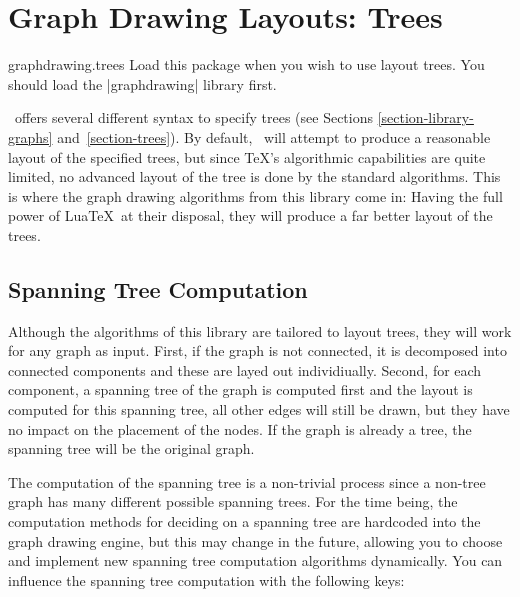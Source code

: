 %
%
%

\section{Graph Drawing Layouts: Trees}
\label{section-first-graphdrawing-library-in-manual}
\label{section-library-graphdrawing-trees}

{

\begin{tikzlibrary}{graphdrawing.trees}
  Load this package when you wish to use layout trees. You should load
  the |graphdrawing| library first. 
\end{tikzlibrary}


\tikzname\ offers several different syntax to specify trees (see
Sections \ref{section-library-graphs} and~\ref{section-trees}). By
default, \tikzname\ will attempt to produce a reasonable layout of the
specified trees, but since \TeX's algorithmic capabilities are quite
limited, no advanced layout of the tree is done by the standard
algorithms. This is where the graph drawing algorithms from this
library come in: Having the full power of Lua\TeX\ at their disposal,
they will produce a far better layout of the trees.



\subsection{Spanning Tree Computation}

Although the algorithms of this library are tailored to layout trees,
they will work for any graph as input. First, if the graph is not
connected, it is decomposed into connected components and these are
layed out individiually. Second, for each component, a spanning tree of
the graph is computed first and the layout is computed for this
spanning tree, all other edges will still be drawn, but they have no
impact on the placement of the nodes. If the graph is already a tree,
the spanning tree will be the original graph.

The computation of the spanning tree is a non-trivial process since
a non-tree graph has many different possible spanning trees. For the
time being, the computation methods for deciding on a spanning tree
are hardcoded into the graph drawing engine, but this may change in
the future, allowing you to choose and implement new spanning tree
computation algorithms dynamically.  You can
influence the spanning tree computation with the following keys:

}
